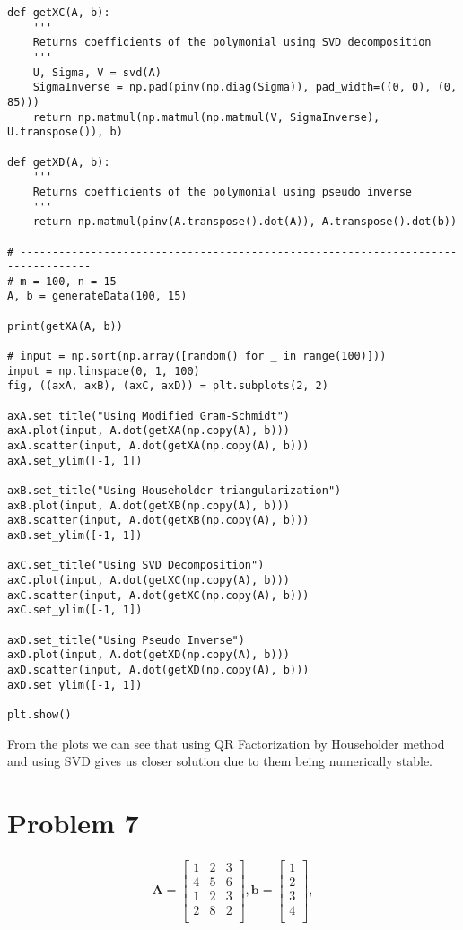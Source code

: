 \documentclass[12pt, letterpaper]{article}
\begin{document}
\begin{verbatim}
def getXC(A, b):
    '''
    Returns coefficients of the polymonial using SVD decomposition
    '''
    U, Sigma, V = svd(A)
    SigmaInverse = np.pad(pinv(np.diag(Sigma)), pad_width=((0, 0), (0, 85)))
    return np.matmul(np.matmul(np.matmul(V, SigmaInverse), U.transpose()), b)

def getXD(A, b):
    '''
    Returns coefficients of the polymonial using pseudo inverse
    '''
    return np.matmul(pinv(A.transpose().dot(A)), A.transpose().dot(b))

# ---------------------------------------------------------------------------------
# m = 100, n = 15
A, b = generateData(100, 15)

print(getXA(A, b))

# input = np.sort(np.array([random() for _ in range(100)]))
input = np.linspace(0, 1, 100)
fig, ((axA, axB), (axC, axD)) = plt.subplots(2, 2)

axA.set_title("Using Modified Gram-Schmidt")
axA.plot(input, A.dot(getXA(np.copy(A), b)))
axA.scatter(input, A.dot(getXA(np.copy(A), b)))
axA.set_ylim([-1, 1])

axB.set_title("Using Householder triangularization")
axB.plot(input, A.dot(getXB(np.copy(A), b)))
axB.scatter(input, A.dot(getXB(np.copy(A), b)))
axB.set_ylim([-1, 1])

axC.set_title("Using SVD Decomposition")
axC.plot(input, A.dot(getXC(np.copy(A), b)))
axC.scatter(input, A.dot(getXC(np.copy(A), b)))
axC.set_ylim([-1, 1])

axD.set_title("Using Pseudo Inverse")
axD.plot(input, A.dot(getXD(np.copy(A), b)))
axD.scatter(input, A.dot(getXD(np.copy(A), b)))
axD.set_ylim([-1, 1])

plt.show()
\end{verbatim}

From the plots we can see that using QR Factorization by Householder method and using SVD gives us closer solution due to them being numerically stable.

\pagebreak
\section*{Problem 7}
\label{sec:prob7}

\begin{align*}
  \mathbf{A} = \begin{bmatrix}
                 1 & 2 & 3 \\
                 4 & 5 & 6 \\
                 1 & 2 & 3 \\
                 2 & 8 & 2 \\
               \end{bmatrix},
  \mathbf{b} = \begin{bmatrix}
                 1 \\
                 2 \\
                 3 \\
                 4 \\
               \end{bmatrix},
\end{align*}
\end{document}

